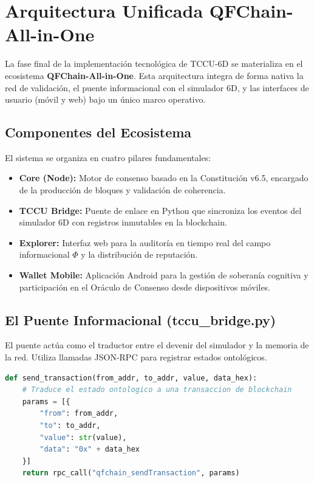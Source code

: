 \chapter{Arquitectura Unificada QFChain-All-in-One}
\label{chap:allinone}

La fase final de la implementación tecnológica de TCCU-6D se materializa en el ecosistema \textbf{QFChain-All-in-One}. Esta arquitectura integra de forma nativa la red de validación, el puente informacional con el simulador 6D, y las interfaces de usuario (móvil y web) bajo un único marco operativo.

\section{Componentes del Ecosistema}
El sistema se organiza en cuatro pilares fundamentales:
\begin{itemize}
    \item \textbf{Core (Node):} Motor de consenso basado en la Constitución v6.5, encargado de la producción de bloques y validación de coherencia.
    \item \textbf{TCCU Bridge:} Puente de enlace en Python que sincroniza los eventos del simulador 6D con registros inmutables en la blockchain.
    \item \textbf{Explorer:} Interfaz web para la auditoría en tiempo real del campo informacional $\Phi$ y la distribución de reputación.
    \item \textbf{Wallet Mobile:} Aplicación Android para la gestión de soberanía cognitiva y participación en el Oráculo de Consenso desde dispositivos móviles.
\end{itemize}

\section{El Puente Informacional (tccu\_bridge.py)}
El puente actúa como el traductor entre el devenir del simulador y la memoria de la red. Utiliza llamadas JSON-RPC para registrar estados ontológicos.

\begin{lstlisting}[language=Python, caption=Interfaz del Puente TCCU-QFChain]
def send_transaction(from_addr, to_addr, value, data_hex):
    # Traduce el estado ontologico a una transaccion de blockchain
    params = [{
        "from": from_addr,
        "to": to_addr,
        "value": str(value),
        "data": "0x" + data_hex
    }]
    return rpc_call("qfchain_sendTransaction", params)
\end{lstlisting}

